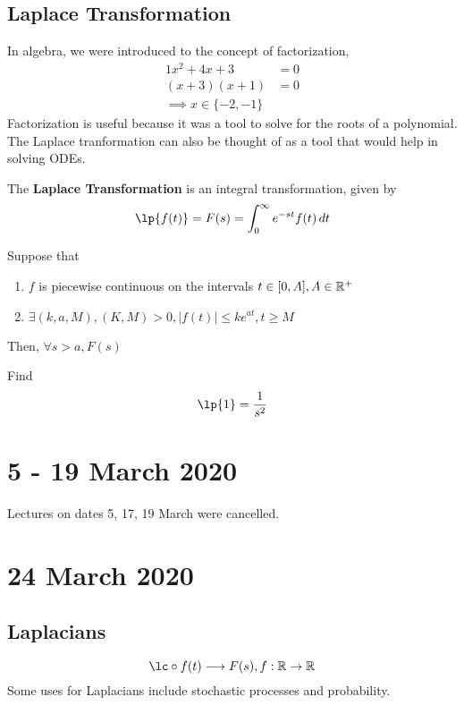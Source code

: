 \documentclass[twoside]{report}
\begin{document}
    \section{Laplace Transformation}
    In algebra, we were introduced to the concept of factorization,
    \begin{alignat}{1}
        x^{2} + 4x + 3 &= 0 \\
        (x + 3)(x + 1) &= 0 \\
        \implies x \in \{-2, -1\}
    \end{alignat}
    Factorization is useful because it was a tool to solve for the roots of a polynomial. The Laplace tranformation can also be thought of as a tool that would help in solving ODEs.

    \begin{definition}
        The \textbf{Laplace Transformation} is an integral transformation, given by
        \begin{equation}
            \lp{f(t)} = F(s) = \int_{0}^{\infty}e^{-st}f(t)\,dt
        \end{equation}
    \end{definition}

    \begin{btheorem} %
        Suppose that
        \begin{enumerate}
            \item $f$ is piecewise continuous on the intervals $t\in[0,A], A \in \mathbb{R}^{+}$
            \item $\exists (k, a, M), (K, M) > 0, |f(t)| \leq ke^{at}, t \geq M$
        \end{enumerate}
        Then, $\forall s > a, F(s)$
    \end{btheorem}
    \np
    \begin{example} %
        Find \begin{equation}
            \lp{1} = \frac{1}{s^{2}}
        \end{equation}
    \end{example}
    \chapter*{5 - 19 March 2020}
    Lectures on dates 5, 17, 19 March were cancelled.
    \chapter{24 March 2020}
    \section{Laplacians}
    \begin{equation}
        \lc \circ f(t) \longrightarrow F(s), f : \RR \to \RR
    \end{equation}
    Some uses for Laplacians include stochastic processes and probability.
\end{document}
